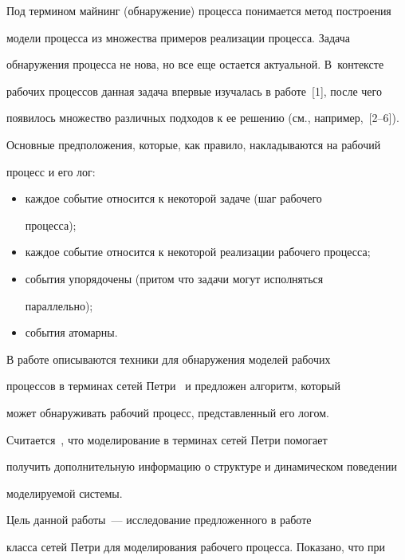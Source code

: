   

  Под термином майнинг (обнаружение) процесса понимается метод построения 

модели процесса из множества примеров реализации процесса. Задача 

обнаружения процесса не нова, но все еще остается актуальной. В~контексте 

рабочих процессов данная задача впервые изучалась в работе~[1], после чего 

появилось множество различных подходов к ее решению (см., например,~[2--6]).

  

  Основные предположения, которые, как правило, накладываются на рабочий 

процесс и его лог:

  \begin{itemize}

\item каждое событие относится к некоторой задаче (шаг рабочего 

процесса);

\item каждое событие относится к некоторой реализации рабочего процесса;

\item события упорядочены (притом что задачи могут исполняться 

параллельно);

\item события атомарны.

\end{itemize}



  В работе\cite{5-tg} описываются техники для обнаружения моделей рабочих 

процессов в терминах сетей Петри~\cite{7-tg} и предложен алгоритм, который 

может обнаруживать рабочий процесс, представленный его логом. 

Считается~\cite{8-tg}, что моделирование в терминах сетей Петри помогает 

получить дополнительную информацию о структуре и динамическом поведении 

моделируемой системы.

  

  Цель данной работы~--- исследование предложенного в работе~\cite{5-tg} 

класса сетей Петри для моделирования рабочего процесса. Показано, что при 

